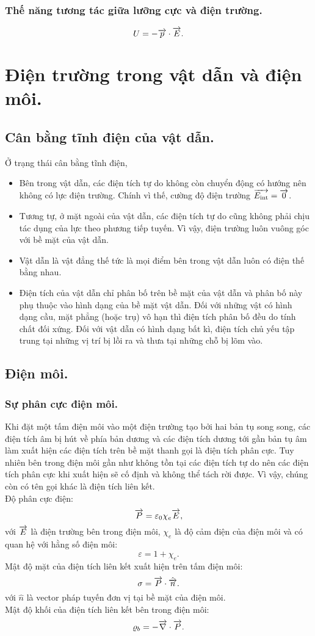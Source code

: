 \begin{appendices}
\subsubsection{Thế năng tương tác giữa lưỡng cực và điện trường.}
    $$U=-\overrightarrow{p}\cdot\overrightarrow{E}.$$
\section{Điện trường trong vật dẫn và điện môi.}
\subsection{Cân bằng tĩnh điện của vật dẫn.}
Ở trạng thái cân bằng tĩnh điện,
\begin{itemize}
    \item Bên trong vật dẫn, các điện tích tự do không còn chuyển động có hướng nên không có lực điện trường. Chính vì thế, cường độ điện trường $
    \overrightarrow{{E}_\mathrm{int}}=\overrightarrow{0}$.
    \item Tương tự, ở mặt ngoài của vật dẫn, các điện tích tự do cũng không phải chịu tác dụng của lực theo phương tiếp tuyến. Vì vậy, điện trường luôn vuông góc với bề mặt của vật dẫn.
    \item Vật dẫn là vật đẳng thế tức là mọi điểm bên trong vật dẫn luôn có điện thế bằng nhau.
    \item Điện tích của vật dẫn chỉ phân bố trên bề mặt của vật dẫn và phân bố này phụ thuộc vào hình dạng của bề mặt vật dẫn. Đối với những vật có hình dạng cầu, mặt phẳng (hoặc trụ) vô hạn thì điện tích phân bố đều do tính chất đối xứng. Đối với vật dẫn có hình dạng bất kì, điện tích chủ yếu tập trung tại những vị trí bị lồi ra và thưa tại những chỗ bị lõm vào.
\end{itemize} 
\subsection{Điện môi.}
\subsubsection{Sự phân cực điện môi.}
    Khi đặt một tấm điện môi vào một điện trường tạo bởi hai bản tụ song song, các điện tích âm bị hút về phía bản dương và các điện tích dương tới gần bản tụ âm làm xuất hiện các điện tích trên bề mặt thanh gọi là điện tích phân cực. Tuy nhiên bên trong điện môi gần như không tồn tại các điện tích tự do nên các điện tích phân cực khi xuất hiện sẽ cố định và không thể tách rời được. Vì vậy, chúng còn có tên gọi khác là điện tích liên kết.\\
    Độ phân cực điện:
    $$\overrightarrow{P}=
      \varepsilon_0\chi_e \overrightarrow{E},$$
    với $\overrightarrow{E}$ là điện trường bên trong điện môi, $\chi_e$ là độ cảm điện của điện môi và có quan hệ với hằng số điện môi:
    $$\varepsilon = 
    1+\chi_e.$$
    Mật độ mặt của điện tích liên kết xuất hiện trên tấm điện môi:\\
    $$\sigma=\overrightarrow{P}\cdot\hat{\overrightarrow{n}}.$$
    với $\hat{{n}}$ là vector pháp tuyến đơn vị tại bề mặt của điện môi.\\
    Mật độ khối của điện tích liên kết bên trong điện môi:
    $$\varrho_b=-\overrightarrow{\nabla}\cdot\overrightarrow{P}.$$

\end{appendices}
